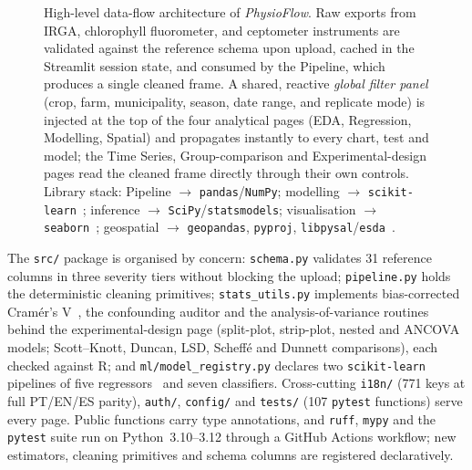 \documentclass[11pt, letterpaper]{article}
\begin{document}
\begin{figure}[htbp]
{%
}
\caption{High-level data-flow architecture of \emph{PhysioFlow}. Raw exports from IRGA, chlorophyll fluorometer, and ceptometer instruments are validated against the reference schema upon upload, cached in the Streamlit session state, and consumed by the Pipeline, which produces a single cleaned frame. A shared, reactive \emph{global filter panel} (crop, farm, municipality, season, date range, and replicate mode) is injected at the top of the four analytical pages (EDA, Regression, Modelling, Spatial) and propagates instantly to every chart, test and model; the Time Series, Group-comparison and Experimental-design pages read the cleaned frame directly through their own controls. Library stack: Pipeline $\to$ \texttt{pandas}/\texttt{NumPy}; modelling $\to$ \texttt{scikit-learn}~\cite{Pedregosa2011}; inference $\to$ \texttt{SciPy}/\texttt{statsmodels}; visualisation $\to$ \texttt{seaborn}~\cite{Waskom2021,Hunter2007}; geospatial $\to$ \texttt{geopandas}, \texttt{pyproj}, \texttt{libpysal}/\texttt{esda}~\cite{Rey2007Pysal}.}\label{fig:architecture}
\end{figure}

The \texttt{src/} package is organised by concern: \texttt{schema.py} validates 31 reference columns in three severity tiers without blocking the upload; \texttt{pipeline.py} holds the deterministic cleaning primitives; \texttt{stats\_utils.py} implements bias-corrected Cram\'er's V~\cite{Bergsma2013}, the confounding auditor and the analysis-of-variance routines behind the experimental-design page (split-plot, strip-plot, nested and ANCOVA models; Scott--Knott, Duncan, LSD, Scheff\'e and Dunnett comparisons), each checked against R; and \texttt{ml/model\_registry.py} declares two \texttt{scikit-learn} pipelines of five regressors~\cite{Breiman2001,Friedman2001} and seven classifiers. Cross-cutting \texttt{i18n/} (771 keys at full PT/EN/ES parity), \texttt{auth/}, \texttt{config/} and \texttt{tests/} (107 \texttt{pytest} functions) serve every page. Public functions carry type annotations, and \texttt{ruff}, \texttt{mypy} and the \texttt{pytest} suite run on Python~3.10--3.12 through a GitHub Actions workflow; new estimators, cleaning primitives and schema columns are registered declaratively.
\end{document}
